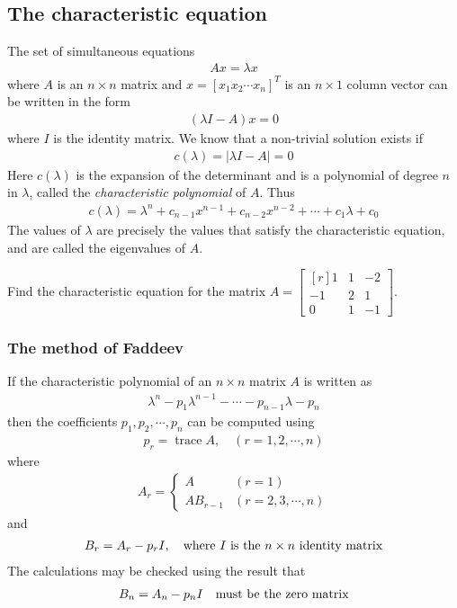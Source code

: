 \documentclass[12pt,a4paper,fleqn]{mycalc}
\begin{document}
	\subsection{The characteristic equation}
	The set of simultaneous equations
	\begin{align*}
	Ax=\lambda x
	\end{align*}
	where \( A \) is an \( n \times n \) matrix and \( x = [x_1 x_2 \cdots x_n]^{T} \) is an \( n \times 1 \) column vector can be written in the form
	\begin{align*}
	(\lambda I-A)x=0
	\end{align*}
	where \( I \) is the identity matrix. We know that a non-trivial solution exists if
	\begin{align*}
	c(\lambda) = |\lambda I - A | = 0
	\end{align*}
	Here \( c(\lambda) \) is the expansion of the determinant and is a polynomial of degree \( n \) in \(\lambda\), called the \emph{characteristic polynomial} of \( A. \) Thus
	\begin{align*}
	c(\lambda)=\lambda^{n}+c_{n-1}x^{n-1}+c_{n-2}x^{n-2}+\cdots+c_1\lambda+c_0
	\end{align*}
	The values of \( \lambda \) are precisely the values that satisfy the characteristic equation, and are called the eigenvalues of \( A. \)
	\begin{example}
		Find the characteristic equation for the matrix
		\( A=\begin{bmatrix*}[r]
		1 & 1 & -2\\
		-1 & 2 & 1\\
		0 & 1 & -1
		\end{bmatrix*}. \)
	\end{example}
	\subsubsection{The method of Faddeev}
	If the characteristic polynomial of an \( n \times n \) matrix \( A \) is written as
	\begin{align*}
	\lambda^n - p_1\lambda^{n-1} - \cdots - p_{n-1}\lambda - p_n
	\end{align*}
	then the coefficients \( p_1, p_2, \cdots , p_n \) can be computed using
	\begin{align*}
	p_r=\operatorname{trace} A,\quad (r=1,2,\cdots,n)
	\end{align*}
	where
	\begin{align*}
	A_r=\begin{cases}
	A &(r=1)\\
	AB_{r-1}&(r=2,3,\cdots,n)
	\end{cases}
	\end{align*}
	and
	\begin{align*}
	B_r=A_r-p_rI,\quad\textnormal{where \( I \) is the \( n\times n \) identity matrix}
	\end{align*}
	The calculations may be checked using the result that
	\begin{align*}
	B_n = A_n - p_nI\quad\textnormal{must be the zero matrix}
	\end{align*}
\end{document}
